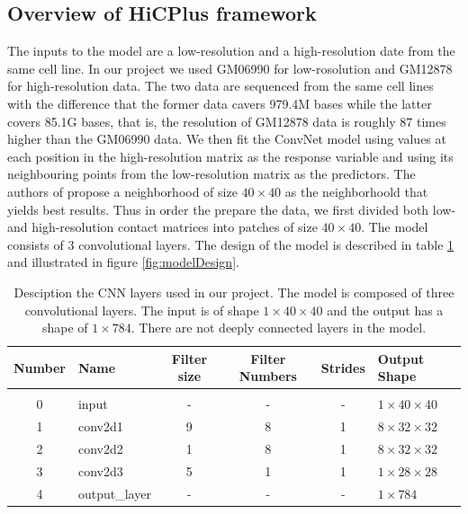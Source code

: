 \documentclass{article}
\begin{document}
\subsection{Overview of HiCPlus framework}
The inputs to the model are a low-resolution
and a high-resolution date from the same
cell line. In our project we used GM06990
for low-rosolution and GM12878 for
high-resolution data. The two data are
sequenced from the same cell lines with
the difference that the former data
cavers 979.4M bases while the latter
covers 85.1G bases, that is, the resolution
of GM12878 data is roughly 87 times higher
than the GM06990 data.
We then fit the ConvNet model using values at 
each position in the high-resolution matrix as 
the response variable and using its 
neighbouring points from the 
low-resolution matrix as the predictors.
The authors of \cite{zhang2018enhancing}
propose a neighborhood of size $40 \times 40$
as the neighborhoold that yields best results.
Thus in order the prepare the data, we first
divided both low- and high-resolution contact
matrices into patches of size $40 \times 40$.
The model consists of 3 convolutional layers.
The design of the model is described in table
\ref{tab:modelDesign} and illustrated in 
figure \ref{fig:modelDesign}.
\begin{table}[]
    \centering
    \begin{tabular}{clcccl}
        Number   & Name           & Filter size & Filter Numbers & Strides & Output Shape \\[5pt] \hline \hline\\
        0        & input          &   -         &-               &    -    & $1\times40\times40$    \\[5pt]
        1        & conv2d1        & 9           & 8              & 1       & $8\times32\times32$    \\[5pt]
        2        & conv2d2        & 1           & 8              & 1       & $8\times32\times32$    \\[5pt]
        3        & conv2d3        & 5           & 1              & 1       & $1\times28\times28$    \\[5pt]
        4        & output\_layer  &     -       &   -            &   -     & $1\times784$     \\[30pt]
    \end{tabular}
    \caption{Desciption the CNN layers used in
    our project. The model is composed of three
    convolutional layers. The input is of shape
    $1\times40\times40$ and the output has a
    shape of $1\times784$. There are not deeply
    connected layers in the model.}
    \label{tab:modelDesign}
\end{table}
\end{document}
